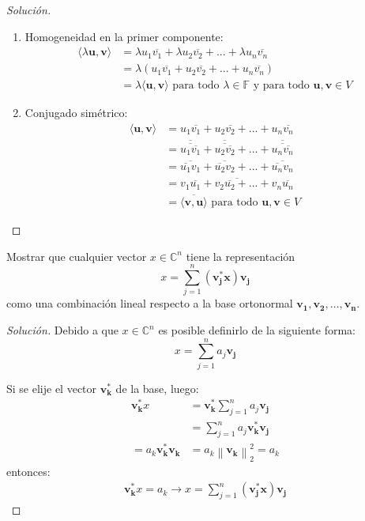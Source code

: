 \documentclass[12pt]{book}
\newcommand{\C}{\mathbb{C}}
\newcommand{\F}{\mathbb{F}}
\newcommand{\todo}{\textrm{ para todo }}
\newcommand\norm[1]{\left\lVert#1\right\rVert}
\newenvironment{solucion}
  {\renewcommand\qedsymbol{$\square$}\begin{proof}[Solución]}
  {\end{proof}}
\begin{document}
\begin{solucion}
\begin{enumerate}
    \item  Homogeneidad en la primer componente: 
    \begin{align*}
        \langle \lambda\textbf{u},\textbf{v} \rangle&=\lambda u_1\overline{v_1}+\lambda u_2\overline{v_2}+...+\lambda u_n\overline{v_n}\\
        &=\lambda(u_1\overline{v_1}+u_2\overline{v_2}+...+u_n\overline{v_n})\\ 
        &=\lambda\langle \textbf{u},\textbf{v} \rangle \todo\lambda \in \F\textrm{ y}\todo\textbf{u},\textbf{v} \in V
    \end{align*}
    
    \item  Conjugado simétrico: 
    \begin{align*}
        \langle \textbf{u},\textbf{v} \rangle &=u_1\overline{v_1}+u_2\overline{v_2}+...+u_n\overline{v_n}\\
        &=\overline{\overline{u_1\overline{v_1}}}+\overline{\overline{u_2\overline{v_2}}}+...+\overline{\overline{u_n\overline{v_n}}}\\
        &=\overline{\overline{u_1}v_1}+\overline{\overline{u_2}v_2}+...+\overline{\overline{u_n}v_n}\\
        &=\overline{v_1\overline{u_1}+v_2\overline{u_2}+...+v_n\overline{u_n}}\\
        &=\overline{\langle \textbf{v},\textbf{u} \rangle} \todo\textbf{u},\textbf{v} \in V    
    \end{align*}
    
\end{enumerate}
\end{solucion}

\eje Mostrar que cualquier vector $x\in\C^n$ tiene la representación
\[ x = \sum^n_{j=1}(\bm{v^*_jx})\bm{v_j}\]
como una combinación lineal respecto a la base ortonormal $\bm{v_1}, \bm{v_2}, \dots, \bm{v_n}$.

\begin{solucion}
Debido a que $x\in\C^n$ es posible definirlo de la siguiente forma:
\[x=\sum_{j=1}^n a_j\bm{v_j}\]

\noindent Si se elije el vector $\bm{v_k^*}$ de la base, luego:
\begin{align*}
    \bm{v_k^*}x&=\bm{v_k^*}\sum_{j=1}^n a_j\bm{v_j}\\
    &=\sum_{j=1}^n a_j\bm{v_k^*} \bm{v_j}\\
    =a_k\bm{v_k^*}\bm{v_k}&=a_k\norm{\bm{v_k}}_2^2=a_k
\end{align*}
\noindent entonces:
\begin{align*}
    \bm{v_k^*}x=a_k \rightarrow x = \sum^n_{j=1}(\bm{v^*_jx})\bm{v_j}
\end{align*}


\end{solucion}
\end{document}
